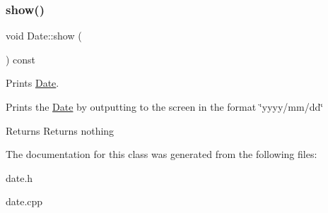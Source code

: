 \subsubsection{\texorpdfstring{show()}{show()}}
{\footnotesize\ttfamily void Date\+::show (\begin{DoxyParamCaption}{ }\end{DoxyParamCaption}) const}



Prints \hyperlink{class_date}{Date}. 

Prints the \hyperlink{class_date}{Date} by outputting to the screen in the format \char`\"{}yyyy/mm/dd\char`\"{}

\begin{DoxyReturn}{Returns}
Returns nothing 
\end{DoxyReturn}


The documentation for this class was generated from the following files\+:\begin{DoxyCompactItemize}
\item 
date.\+h\item 
date.\+cpp\end{DoxyCompactItemize}
